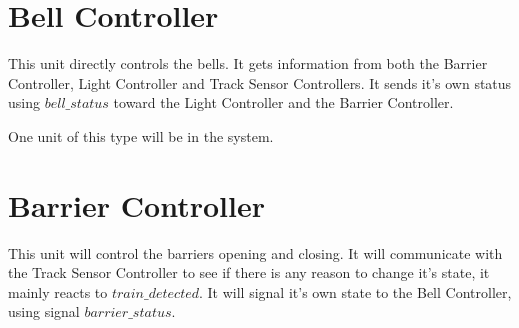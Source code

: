 \documentclass[final]{report}
\begin{document}
\section{Bell Controller}
This unit directly controls the bells.
It gets information from both the Barrier Controller, Light Controller and Track Sensor Controllers.
It sends it's own status using $bell\_status$ toward the Light Controller and the Barrier Controller.

One unit of this type will be in the system.
\section{Barrier Controller}
This unit will control the barriers opening and closing.
It will communicate with the Track Sensor Controller to see if there is any reason to change it's state, it mainly reacts to $train\_detected$.
It will signal it's own state to the Bell Controller, using signal $barrier\_status$.
\end{document}
